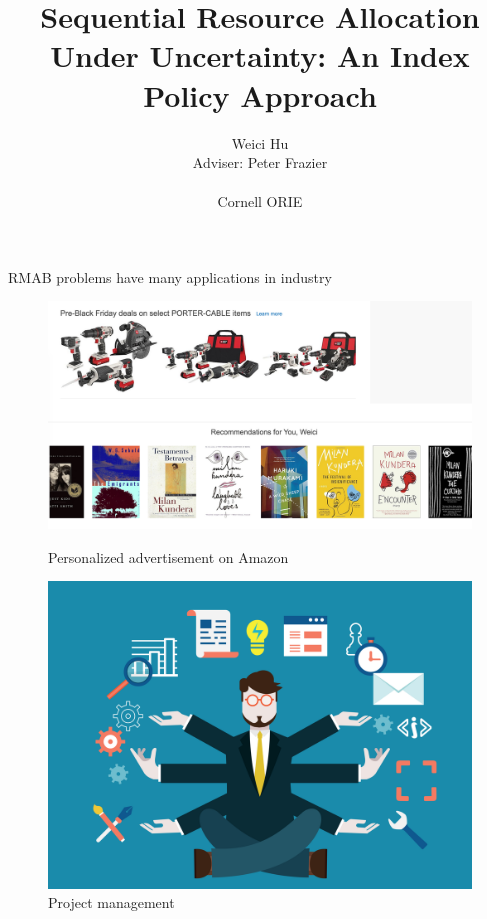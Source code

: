 \documentclass{beamer}
\begin{document}
\title{Sequential Resource Allocation Under Uncertainty: An Index Policy Approach}
\author{Weici Hu\\
Adviser: Peter Frazier\\
\hspace{1mm}\\
Cornell ORIE}
\begin{frame}
   \maketitle
\end{frame}

\begin{frame}{RMAB problems have many applications in industry}
\begin{figure}[!tbp]
  \centering
  \begin{minipage}[b]{0.55\textwidth}
    \includegraphics[width=\textwidth]{ads.png}
    \caption{Personalized advertisement on Amazon}
  \end{minipage}
  \hfill
  \begin{minipage}[b]{0.4\textwidth}
    \includegraphics[width=\textwidth]{project_management.jpg}
    \caption{Project management}
  \end{minipage}
\end{figure}
\end{frame}
\end{document}
